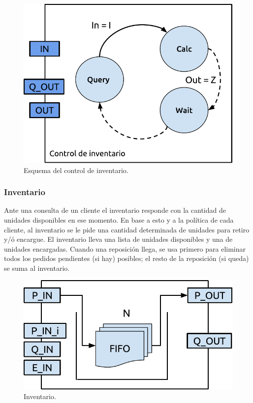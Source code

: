 \documentclass[10pt]{article}
\begin{document}
\begin{figure}
\centering
\includegraphics[scale=1]{img/figura6}
\caption{Esquema del control de inventario.}
\label{fig:fig6}
\end{figure}


\subsubsection{Inventario}

Ante una consulta de un cliente el inventario responde con la cantidad de unidades disponibles en ese momento. En base a esto y a la política de cada cliente, al inventario se le pide una cantidad determinada de unidades para retiro y/ó encargue.
El inventario lleva una lista de unidades disponibles y una de unidades encargadas. Cuando una reposición llega, se usa primero para eliminar todos los pedidos pendientes (si hay) posibles; el resto de la reposición (si queda) se suma al inventario. 

\begin{figure}
\centering
\includegraphics[scale=1]{img/figura7}
\caption{Inventario.}
\label{fig:fig7}
\end{figure}
\end{document}
